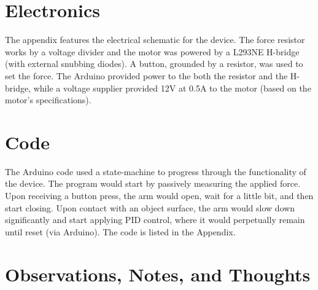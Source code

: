 \documentclass[letterpaper, 10 pt, conference]{ieeeconf}  %
\begin{document}

\section{Electronics}

The appendix features the electrical schematic for the device. The force resistor works by a voltage divider and the motor was powered by a L293NE H-bridge (with external snubbing diodes). A button, grounded by a resistor, was used to set the force. The Arduino provided power to the both the resistor and the H-bridge, while a voltage supplier provided 12V at 0.5A to the motor (based on the motor's specifications).




\section{Code}

The Arduino code used a state-machine to progress through the functionality of the device. The program would start by passively measuring the applied force. Upon receiving a button press, the arm would open, wait for a little bit, and then start closing. Upon contact with an object surface, the arm would slow down significantly and start applying PID control, where it would perpetually remain until reset (via Arduino). The code is listed in the Appendix.

\section{Observations, Notes, and Thoughts}
\end{document}
